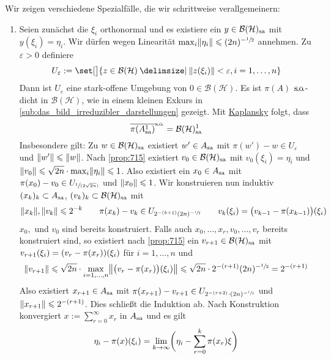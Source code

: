 \begin{beweis}
	Wir zeigen verschiedene Spezialfälle, die wir schrittweise verallgemeinern:
	\begin{enumerate}[label={Teil \Roman*.},wide,font=\bfseries\scshape,itemsep=2pt]
		\item \label{enum:kad:1} Seien zunächst die $\xi_i$ orthonormal und es existiere ein $y \in \mathcal{B}(\mathcal{H})_\sa$ mit $y(\xi_i)=\eta_i$.
		Wir dürfen wegen Linearität $\max_i \norm*{\eta_i} \le (2n)^{- \sfrac{1}{2}}$ annehmen.
		Zu $\varepsilon>0$ definiere
		\[
			U_\varepsilon := \set[\big]{z \in \mathcal{B}(\mathcal{H}) \given \norm*{z(\xi_i)} < \varepsilon , i=1,\ldots ,n}
		\]
		Dann ist $U_\varepsilon$ eine stark-offene Umgebung von $0 \in \mathcal{B}(\mathcal{H})$.
		Es ist $\pi(A)$ $\so$-dicht in $\mathcal{B}(\mathcal{H})$, wie in einem kleinen Exkurs in \cref{sub:das_bild_irreduzibler_darstellungen} gezeigt.
		Mit \hyperref[satz:624]{Kaplansky} folgt, dass 
		\[
			\overline{\pi(A_\sa^1)}^\so = \mathcal{B}(\mathcal{H})_\sa^1
		\]
		Insbesondere gilt:
		Zu $w \in \mathcal{B}(\mathcal{H})_\sa$ existiert $w' \in A_\sa$ mit $\pi(w')-w \in U_\varepsilon$ und $\norm*{w'} \le \norm*{w}$.
		Nach \autoref{prop:715} existiert $v_0 \in \mathcal{B}(\mathcal{H})_\sa$ mit $v_0(\xi_i)=\eta_i$ und $\norm*{v_0} \le \sqrt{2n} \cdot \max_i \norm*{\eta_i} \le 1$.
		Also existiert ein $x_0 \in A_\sa$ mit $\pi(x_0)-v_0 \in U_{\sfrac{1}{(2 \sqrt{2n})}}$ und $\norm*{x_0} \le 1$.
		Wir konstruieren nun induktiv $(x_k)_k \subset A_\sa$, $(v_k)_k \subset \mathcal{B}(\mathcal{H})_\sa$ mit 
		\[
			\norm*{x_k}, \norm*{v_k} \le 2^{-k} \qquad  \pi(x_k) -v_k \in U_{2^{-(k+1)} (2n)^{- \sfrac{1}{2}}} \qquad v_k(\xi_i) = \enbrace[\big]{v_{k-1} - \pi(x_{k-1})}(\xi_i)
		\]
		$x_0,$ und $v_0$ sind bereits konstruiert.
		Falls auch $x_0, \ldots ,x_r, v_0, \ldots ,v_r$ bereits konstruiert sind, so existiert nach \autoref{prop:715} ein $v_{r+1} \in \mathcal{B}(\mathcal{H})_\sa$ mit 
		$v_{r+1}(\xi_i)= \enbrace*{v_r- \pi(x_r)}(\xi_i)$ für $i=1,\ldots ,n$ und 
		\[
			\norm*{v_{r+1}} \le \sqrt{2n} \cdot \max_{i=1,\ldots ,n} \norm*{\enbrace[\big]{v_r - \pi(x_r)}(\xi_i)} \le \sqrt{2n} \cdot 2^{-(r+1)} (2n)^{- \sfrac{1}{2}} = 2^{-(r+1)}
		\]
		Also existiert $x_{r+1} \in A_\sa$ mit $\pi(x_{r+1}) - v_{r+1} \in U_{2^{-(r+2)} \cdot (2n)^{-\sfrac{1}{2}}}$ und $\norm*{x_{r+1}} \le 2^{-(r+1)}$.
		Dies schließt die Induktion ab.
		Nach Konstruktion konvergiert $x := \sum_{r=0}^{\infty} x_r$ in $A_\sa$ und es gilt
		\begin{align}
			\eta_i - \pi(x)(\xi_i) 
			&= \lim_{k \to \infty} \enbrace[\bigg]{\eta_i - \sum_{r=0}^{k} \pi(x_r) \xi}\\ 

\end{align}
\end{enumerate}
\end{beweis}

